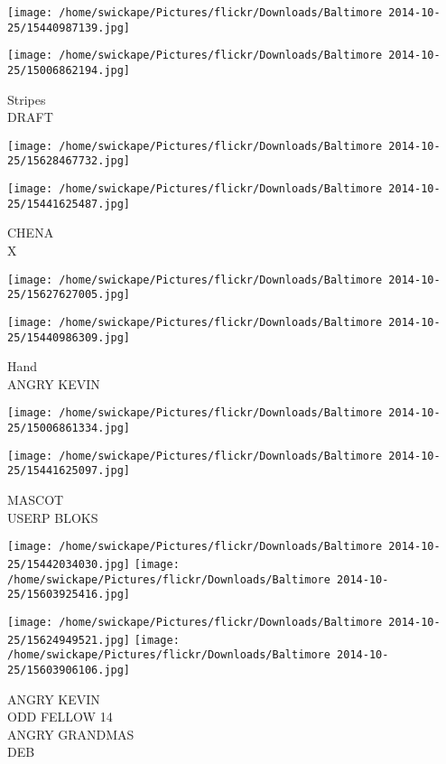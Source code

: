 \documentclass[10pt,letterpaper]{article}
\begin{document}
\texttt{[image: /home/swickape/Pictures/flickr/Downloads/Baltimore 2014-10-25/15440987139.jpg]}

\vspace{0.25in}
\texttt{[image: /home/swickape/Pictures/flickr/Downloads/Baltimore 2014-10-25/15006862194.jpg]}

Stripes\\
DRAFT
\pagebreak

\texttt{[image: /home/swickape/Pictures/flickr/Downloads/Baltimore 2014-10-25/15628467732.jpg]}

\vspace{0.25in}
\texttt{[image: /home/swickape/Pictures/flickr/Downloads/Baltimore 2014-10-25/15441625487.jpg]}

CHENA\\
X
\pagebreak

\texttt{[image: /home/swickape/Pictures/flickr/Downloads/Baltimore 2014-10-25/15627627005.jpg]}

\vspace{0.25in}
\texttt{[image: /home/swickape/Pictures/flickr/Downloads/Baltimore 2014-10-25/15440986309.jpg]}

Hand\\
ANGRY KEVIN
\pagebreak

\texttt{[image: /home/swickape/Pictures/flickr/Downloads/Baltimore 2014-10-25/15006861334.jpg]}

\vspace{0.25in}
\texttt{[image: /home/swickape/Pictures/flickr/Downloads/Baltimore 2014-10-25/15441625097.jpg]}

MASCOT\\
USERP BLOKS
\pagebreak

\texttt{[image: /home/swickape/Pictures/flickr/Downloads/Baltimore 2014-10-25/15442034030.jpg]}
\texttt{[image: /home/swickape/Pictures/flickr/Downloads/Baltimore 2014-10-25/15603925416.jpg]}

\texttt{[image: /home/swickape/Pictures/flickr/Downloads/Baltimore 2014-10-25/15624949521.jpg]}
\texttt{[image: /home/swickape/Pictures/flickr/Downloads/Baltimore 2014-10-25/15603906106.jpg]}

ANGRY KEVIN\\
ODD FELLOW 14\\
ANGRY GRANDMAS\\
DEB
\pagebreak
\end{document}
